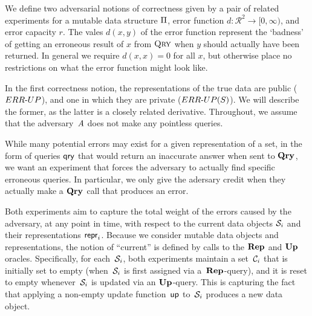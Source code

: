 


We define two adversarial notions of correctness given by a pair of related experiments for a mutable data structure $\mathrm{\Pi}$, error function $d: \mathcal{R}^2 \to [0,\infty)$, and error capacity $r$. The vales $d(x,y)$ of the error function represent the `badness' of getting an erroneous result of $x$ from $\textsc{Qry}$ when $y$ should actually have been returned. In general we require $d(x,x) = 0$ for all $x$, but otherwise place no restrictions on what the error function might look like.

In the first correctness notion, the representations of the true data are public (${ERR\mbox{-}UP}$), and one in which they are private (${ERR\mbox{-}UP(S)}$). We will describe the former, as the latter is a closely related derivative. Throughout, we assume that the adversary~$\mathit{A}$ does not make any pointless queries. 

While many potential errors may exist for a given representation of a set, in the form of queries $\mathsf{qry}$ that would return an inaccurate answer when sent to $\mathbf{Qry}\hspace{0.5pt}$, we want an experiment that forces the adversary to actually find specific erroneous queries. In particular, we only give the adersary credit when they actually make a $\mathbf{Qry}\hspace{0.5pt}$ call that produces an error.

Both experiments aim to capture the total weight of the errors caused by the adversary, at any point in time, with respect to the current data objects $\mathcal{S}_i$ and their representations $\mathsf{repr}_i$.  Because we consider mutable data objects and representations, the notion of ``current'' is defined by calls to the $\mathbf{Rep}\hspace{0.5pt}$ and $\mathbf{Up}\hspace{0.5pt}$ oracles.  Specifically, for each~$\mathcal{S}_i$, both experiments maintain a set~$\mathcal{C}_i$ that is initially set to empty (when~$\mathcal{S}_i$ is first assigned via a~$\mathbf{Rep}\hspace{0.5pt}$-query), and it is reset to empty whenever~$\mathcal{S}_i$ is updated via an $\mathbf{Up}\hspace{0.5pt}$-query.  This is capturing the fact that applying a non-empty update function~$\mathsf{up}$ to~$\mathcal{S}_i$ produces a new data object.

